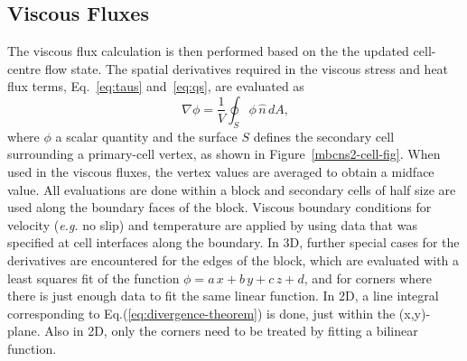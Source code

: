 \subsection{Viscous Fluxes}
%
The viscous flux calculation is then performed based on the the updated cell-centre flow state.
The spatial derivatives required in the viscous stress and heat flux terms, Eq.~\ref{eq:taus} and~\ref{eq:qs}, 
are evaluated as
\begin{equation}
 \nabla \phi = \frac{1}{V} \oint_S \phi \, \hat{n} \, dA \text{,}
 \label{eq:divergence-theorem}
\end{equation}
where $\phi$ a scalar quantity and the surface $S$ defines the secondary cell surrounding a primary-cell vertex, 
as shown in Figure~\ref{mbcns2-cell-fig}.
When used in the viscous fluxes, the vertex values are averaged to obtain a midface value.
All evaluations are done within a block and
secondary cells of half size are used along the boundary faces of the block.
Viscous boundary conditions for velocity (\textit{e.g.} no slip) and temperature are 
applied by using data that was specified at cell interfaces along the boundary.
In 3D, further special cases for the derivatives are encountered for the edges of the block, 
which are evaluated with a least squares fit of the function $\phi = a\, x + b\, y + c\, z + d$,
and for corners where there is just enough data to fit the same linear function.
In 2D, a line integral corresponding to Eq.(\ref{eq:divergence-theorem}) is done, just within the (x,y)-plane.
Also in 2D, only the corners need to be treated by fitting a bilinear function. 


